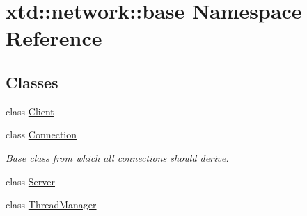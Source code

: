 \hypertarget{namespacextd_1_1network_1_1base}{}\section{xtd\+:\+:network\+:\+:base Namespace Reference}
\label{namespacextd_1_1network_1_1base}
\subsection*{Classes}
\begin{DoxyCompactItemize}
\item 
class \hyperlink{classxtd_1_1network_1_1base_1_1Client}{Client}
\item 
class \hyperlink{classxtd_1_1network_1_1base_1_1Connection}{Connection}
\begin{DoxyCompactList}\small\item\em Base class from which all connections should derive. \end{DoxyCompactList}\item 
class \hyperlink{classxtd_1_1network_1_1base_1_1Server}{Server}
\item 
class \hyperlink{classxtd_1_1network_1_1base_1_1ThreadManager}{Thread\+Manager}
\end{DoxyCompactItemize}
